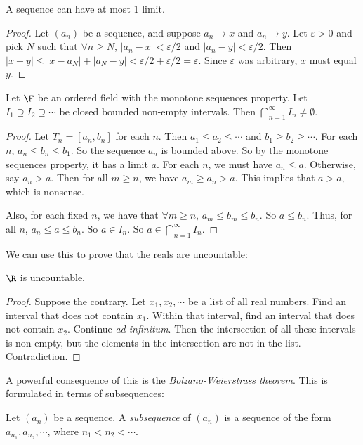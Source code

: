 \documentclass[a4paper]{article}
\begin{document}
\begin{lemma}
  A sequence can have at most 1 limit.
\end{lemma}

\begin{proof}
Let $(a_n)$ be a sequence, and suppose $a_n \to x$ and $a_n\to y$. Let $\varepsilon > 0$ and pick $N$ such that $\forall n \geq N$, $|a_n - x| < \varepsilon/2$ and $|a_n - y| < \varepsilon/2$. Then $|x - y| \leq |x - a_N| + |a_N - y| < \varepsilon/2 + \varepsilon/2 = \varepsilon$. Since $\varepsilon$ was arbitrary, $x$ must equal $y$.
\end{proof}

\begin{lemma}
  Let $\F$ be an ordered field with the monotone sequences property. Let $I_1\supseteq I_2 \supseteq \cdots$ be closed bounded non-empty intervals. Then $\bigcap_{n = 1}^\infty I_n \not= \emptyset$.
\end{lemma}

\begin{proof}
  Let $T_n = [a_n, b_n]$ for each $n$. Then $a_1 \leq a_2 \leq\cdots$ and $b_1 \geq b_2\geq \cdots$. For each $n$, $a_n \leq b_n \leq b_1$. So the sequence $a_n$ is bounded above. So by the monotone sequences property, it has a limit $a$. For each $n$, we must have $a_n\leq a$. Otherwise, say $a_n > a$. Then for all $m \geq n$, we have $a_m \geq a_n > a$. This implies that $a > a$, which is nonsense.

  Also, for each fixed $n$, we have that $\forall m\geq n$, $a_m \leq b_m \leq b_n$. So $a \leq b_n$. Thus, for all $n$, $a_n \leq a \leq b_n$. So $a\in I_n$. So $a\in \bigcap_{n = 1}^\infty I_n$.
\end{proof}

We can use this to prove that the reals are uncountable:
\begin{prop}
  $\R$ is uncountable.
\end{prop}

\begin{proof}
  Suppose the contrary. Let $x_1, x_2, \cdots$ be a list of all real numbers. Find an interval that does not contain $x_1$. Within that interval, find an interval that does not contain $x_2$. Continue \emph{ad infinitum}. Then the intersection of all these intervals is non-empty, but the elements in the intersection are not in the list. Contradiction.
\end{proof}

A powerful consequence of this is the \emph{Bolzano-Weierstrass theorem}. This is formulated in terms of subsequences:
\begin{defi}[Subsequence]
  Let $(a_n)$ be a sequence. A \emph{subsequence} of $(a_n)$ is a sequence of the form $a_{n_1}, a_{n_2}, \cdots$, where $n_1 < n_2 < \cdots$.
\end{defi}
\end{document}
